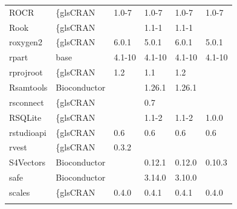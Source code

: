 \begin{longtable}{llllll}
\rowcolor{black!10}
ROCR                          & \{gls{CRAN}                      & 1.0-7       & 1.0-7       & 1.0-7          & 1.0-7             \\
\rowcolor{black!5}
Rook                          & \{gls{CRAN}                      &             & 1.1-1       & 1.1-1          &                    \\
\rowcolor{black!10}
roxygen2                      & \{gls{CRAN}                      & 6.0.1       & 5.0.1       & 6.0.1          & 5.0.1             \\
\rowcolor{black!5}
rpart                         & base                      & 4.1-10      & 4.1-10      & 4.1-10         & 4.1-10             \\
\rowcolor{black!10}
rprojroot                     & \{gls{CRAN}                      & 1.2         & 1.1         & 1.2            &                   \\
\rowcolor{black!5}
Rsamtools                     & Bioconductor              &             & 1.26.1      & 1.26.1         &                    \\
\rowcolor{black!10}
rsconnect                     & \{gls{CRAN}                      &             & 0.7         &                &                   \\
\rowcolor{black!5}
RSQLite                       & \{gls{CRAN}                      &             & 1.1-2       & 1.1-2          & 1.0.0              \\
\rowcolor{black!10}
rstudioapi                    & \{gls{CRAN}                      & 0.6         & 0.6         & 0.6            & 0.6               \\
\rowcolor{black!5}
rvest                         & \{gls{CRAN}                      & 0.3.2       &             &                &                    \\
\rowcolor{black!10}
S4Vectors                     & Bioconductor              &             & 0.12.1      & 0.12.0         & 0.10.3            \\
\rowcolor{black!5}
safe                          & Bioconductor              &             & 3.14.0      & 3.10.0         &                    \\
\rowcolor{black!10}
scales                        & \{gls{CRAN}                      & 0.4.0       & 0.4.1       & 0.4.1          & 0.4.0             \\
\rowcolor{black!5}

\end{longtable}
